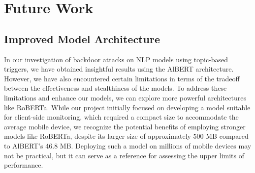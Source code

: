 \chapter{Future Work}

\section{Improved Model Architecture}

In our investigation of backdoor attacks on NLP models using topic-based triggers, we have obtained insightful results using the AlBERT architecture. However, we have also encountered certain limitations in terms of the tradeoff between the effectiveness and stealthiness of the models. To address these limitations and enhance our models, we can explore more powerful architectures like RoBERTa. While our project initially focused on developing a model suitable for client-side monitoring, which required a compact size to accommodate the average mobile device, we recognize the potential benefits of employing stronger models like RoBERTa, despite its larger size of approximately 500 MB compared to AlBERT's 46.8 MB. Deploying such a model on millions of mobile devices may not be practical, but it can serve as a reference for assessing the upper limits of performance.

